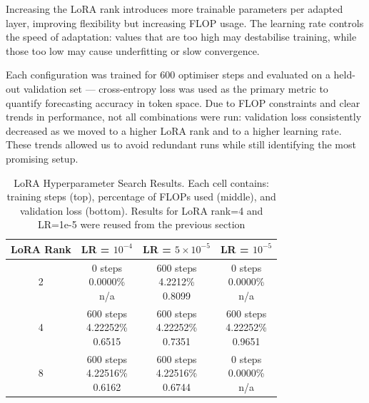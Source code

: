 \documentclass[a4paper,12pt]{article}
\begin{document}
Increasing the LoRA rank introduces more trainable parameters per adapted layer, improving flexibility but increasing FLOP usage. The learning rate controls the speed of adaptation: values that are too high may destabilise training, while those too low may cause underfitting or slow convergence.

Each configuration was trained for 600 optimiser steps and evaluated on a held-out validation set — cross-entropy loss was used as the primary metric to quantify forecasting accuracy in token space. Due to FLOP constraints and clear trends in performance, not all combinations were run: validation loss consistently decreased as we moved to a higher LoRA rank and to a higher learning rate. These trends allowed us to avoid redundant runs while still identifying the most promising setup.

\vspace{0.2cm}

\begin{table}[H]
  \centering
  \begin{tabular}{|c|c|c|c|}
      \hline
      \textbf{LoRA Rank} & \textbf{LR = $10^{-4}$} & \textbf{LR = $5 \times 10^{-5}$} & \textbf{LR = $10^{-5}$} \\
      \hline
      2 & 
      \makecell{0 steps \\ 0.0000\% \\ n/a} & 
      \makecell{600 steps \\ 4.2212\% \\ 0.8099} & 
      \makecell{0 steps \\ 0.0000\% \\ n/a} \\
      \hline
      4 & 
      \makecell{600 steps \\ 4.22252\% \\ 0.6515} & 
      \makecell{600 steps \\ 4.22252\% \\ 0.7351} & 
      \makecell{600 steps \\ 4.22252\% \\ 0.9651} \\
      \hline
      8 & 
      \makecell{600 steps \\ 4.22516\% \\ 0.6162} & 
      \makecell{600 steps \\ 4.22516\% \\ 0.6744} & 
      \makecell{0 steps \\ 0.0000\% \\ n/a} \\
      \hline
  \end{tabular}
  \vspace{0.2cm}
  \caption{LoRA Hyperparameter Search Results. Each cell contains: training steps (top), percentage of FLOPs used (middle), and validation loss (bottom). Results for LoRA rank=4 and LR=1e-5 were reused from the previous section}
  \label{tab:lora_grid_search}
\end{table}
\end{document}
